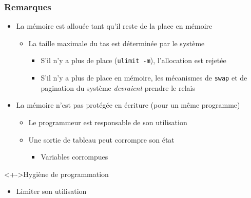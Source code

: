 \begin{frame}
\frametitle{Remarques}
\begin{itemize}[<+->]
\item La mémoire est allouée tant qu'il reste de la place en mémoire
	\begin{itemize}
	\item La taille maximale du tas est déterminée par le système
		\begin{itemize}
		\item S'il n'y a plus de place (\texttt{ulimit -m}), l'allocation est rejetée	
		\item S'il n'y a plus de place en mémoire, les mécanismes de \texttt{swap} et de pagination du système \emph{devraient} prendre le relais 
		\end{itemize}
	\end{itemize}
\item La mémoire n'est pas protégée en écriture (pour un même programme)
	\begin{itemize}
	\item Le programmeur est responsable de son utilisation
	\item Une sortie de tableau peut corrompre son état
		\begin{itemize}
		\item Variables corrompues
		\end{itemize}
	\end{itemize}
\end{itemize}
\begin{block}<+->{Hygiène de programmation}
	\begin{itemize}
	\item Limiter son utilisation \cpp
	\end{itemize}
\end{block}
\end{frame}

